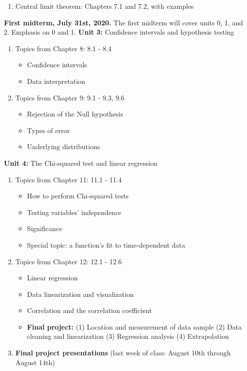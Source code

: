 \documentclass[10pt]{article}
\begin{document}
\begin{outline}[enumerate]
\begin{enumerate}
\item Central limit theorem: Chapters 7.1 and 7.2, with examples
\end{enumerate}
\1 \textbf{First midterm, July 31st, 2020.} The first midterm will cover units 0, 1, and 2. Emphasis on 0 and 1.
\1 \textbf{Unit 3:} Confidence intervals and hypothesis testing
\begin{enumerate}
\item Topics from Chapter 8: 8.1 - 8.4
\begin{itemize}
\item Confidence intervals
\item Data interpretation
\end{itemize}
\item Topics from Chapter 9: 9.1 - 9.3, 9.6
\begin{itemize}
\item Rejection of the Null hypothesis
\item Types of error
\item Underlying distributions
\end{itemize}
\end{enumerate}
\1 \textbf{Unit 4:} The Chi-squared test and linear regression
\begin{enumerate}
\item Topics from Chapter 11: 11.1 - 11.4
\begin{itemize}
\item How to perform Chi-squared tests
\item Testing variables' independence
\item Significance
\item Special topic: a function's fit to time-dependent data
\end{itemize} 
\item Topics from Chapter 12: 12.1 - 12.6
\begin{itemize}
\item Linear regression
\item Data linearization and visualization
\item Correlation and the correlation coefficient
\item \textbf{Final project:} (1) Location and measurement of data sample (2) Data cleaning and linearization (3) Regression analysis (4) Extrapolation
\end{itemize}
\item \textbf{Final project presentations} (last week of class: August 10th through August 14th)
\end{enumerate}

\end{outline}
\end{document}

